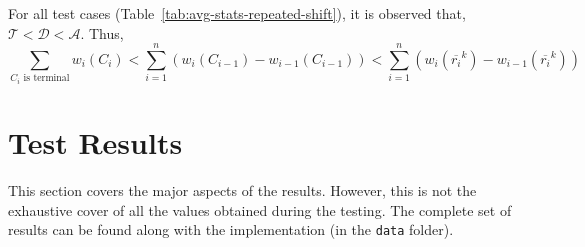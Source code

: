 For all test cases (Table~\ref{tab:avg-stats-repeated-shift}), it is observed that, $\mathcal{T} < \mathcal{D} < \mathcal{A} $. Thus, 
$$\sum_{C_i\text{ is terminal}} w_i(C_i) < \sum_{i=1}^{n} (w_i(C_{i-1}) - w_{i-1}(C_{i-1})) < \sum_{i=1}^{n} (w_i(\overline{r_i}^k) - w_{i-1}(\overline{r_i}^k))$$

\section{Test Results}\label{sec:results}

This section covers the major aspects of the results. However, this is not the exhaustive cover of all the values obtained during the testing. The complete set of results can be found along with the implementation (in the \texttt{data} folder).






